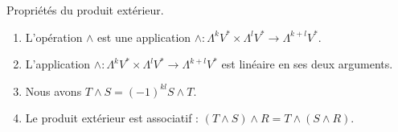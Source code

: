 \begin{lemma}		\label{LEMooKEOWooNDXqgr}
	Propriétés du produit extérieur.
	\begin{enumerate}
		\item		\label{ITEMooELVSooHlORJy}
		      L'opération \( \wedge\) est une application \(\wedge \colon \Lambda^kV^*\times\Lambda^lV^*\to \Lambda^{k+l}V^*  \).
		\item		\label{ITEMooRUBEooKVHFSz}
		      L'application \(\wedge \colon \Lambda^kV^*\times\Lambda^lV^*\to \Lambda^{k+l}V^*  \) est linéaire en ses deux arguments.
		\item		\label{ITEMooTCWPooIJYaRE}
		      Nous avons \( T\wedge S=(-1)^{kl}S\wedge T\).
		\item		\label{ITEMooKFPZooFenmCT}
		      Le produit extérieur est associatif : \( (T\wedge S)\wedge R=T\wedge(S\wedge R)\).
	\end{enumerate}
\end{lemma}

